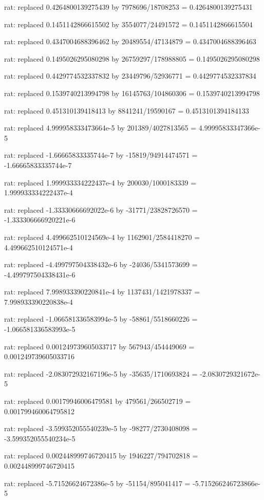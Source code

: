 \documentclass[a4paper,10pt]{article}
\begin{document}
\begin{eulernotebook}
\begin{eulercomment}
\begin{eulercomment}
\begin{eulercomment}
\begin{eulercomment}
\begin{eulercomment}
\begin{eulercomment}
\begin{eulercomment}
\begin{eulercomment}
\begin{eulercomment}
\begin{eulercomment}
\begin{eulercomment}
\begin{eulercomment}
\begin{eulercomment}
\begin{eulercomment}
\begin{eulercomment}
\begin{eulercomment}
\begin{euleroutput}
  rat: replaced 0.4264800139275439 by 7978696/18708253 = 0.4264800139275431
  
  rat: replaced 0.1451142866615502 by 3554077/24491572 = 0.1451142866615504
  
  rat: replaced 0.4347004688396462 by 20489554/47134879 = 0.4347004688396463
  
  rat: replaced 0.1495026295080298 by 26759297/178988805 = 0.1495026295080298
  
  rat: replaced 0.4429774532337832 by 23449796/52936771 = 0.4429774532337834
  
  rat: replaced 0.1539740213994798 by 16145763/104860306 = 0.1539740213994798
  
  rat: replaced 0.451310139418413 by 8841241/19590167 = 0.4513101394184133
  
  rat: replaced 4.999958333473664e-5 by 201389/4027813565 = 4.99995833347366e-5
  
  rat: replaced -1.66665833335744e-7 by -15819/94914474571 = -1.66665833335744e-7
  
  rat: replaced 1.999933334222437e-4 by 200030/1000183339 = 1.999933334222437e-4
  
  rat: replaced -1.33330666692022e-6 by -31771/23828726570 = -1.333306666920221e-6
  
  rat: replaced 4.499662510124569e-4 by 1162901/2584418270 = 4.499662510124571e-4
  
  rat: replaced -4.499797504338432e-6 by -24036/5341573699 = -4.499797504338431e-6
  
  rat: replaced 7.998933390220841e-4 by 1137431/1421978337 = 7.998933390220838e-4
  
  rat: replaced -1.066581336583994e-5 by -58861/5518660226 = -1.066581336583993e-5
  
  rat: replaced 0.001249739605033717 by 567943/454449069 = 0.001249739605033716
  
  rat: replaced -2.083072932167196e-5 by -35635/1710693824 = -2.0830729321672e-5
  
  rat: replaced 0.00179946006479581 by 479561/266502719 = 0.001799460064795812
  
  rat: replaced -3.599352055540239e-5 by -98277/2730408098 = -3.599352055540234e-5
  
  rat: replaced 0.002448999746720415 by 1946227/794702818 = 0.002448999746720415
  
  rat: replaced -5.71526624672386e-5 by -51154/895041417 = -5.715266246723866e-5
  

\end{euleroutput}
\end{eulercomment}
\end{eulercomment}
\end{eulercomment}
\end{eulercomment}
\end{eulercomment}
\end{eulercomment}
\end{eulercomment}
\end{eulercomment}
\end{eulercomment}
\end{eulercomment}
\end{eulercomment}
\end{eulercomment}
\end{eulercomment}
\end{eulercomment}
\end{eulercomment}
\end{eulercomment}
\end{eulernotebook}
\end{document}
